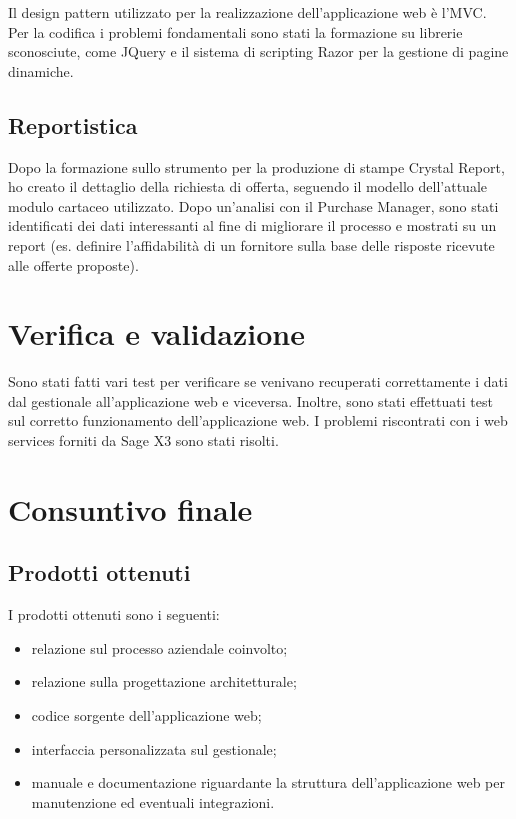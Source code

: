 Il design pattern utilizzato per la realizzazione dell’applicazione web è l’MVC.
Per la codifica i problemi fondamentali sono stati la formazione su librerie sconosciute, come JQuery e il sistema di scripting Razor per la gestione di pagine dinamiche. 



\subsection{Reportistica}

Dopo la formazione sullo strumento per la produzione di stampe Crystal Report, ho creato il dettaglio della richiesta di offerta, seguendo il modello dell’attuale modulo
cartaceo utilizzato.
Dopo un’analisi con il Purchase Manager, sono stati identificati dei dati interessanti al fine di migliorare il processo e mostrati su un report (es. definire l’affidabilità di un fornitore sulla base delle risposte ricevute alle offerte proposte).




\section{Verifica e validazione}

Sono stati fatti vari test per verificare se venivano recuperati correttamente i dati dal gestionale all’applicazione web e viceversa. Inoltre, sono stati effettuati test sul corretto funzionamento dell’applicazione web. I problemi riscontrati con i web services forniti da Sage X3 sono stati risolti.




\section{Consuntivo finale}

\subsection{Prodotti ottenuti}

I prodotti ottenuti sono i seguenti:

\begin{itemize}
	\item relazione sul processo aziendale coinvolto;
	\item relazione sulla progettazione architetturale;
	\item codice sorgente dell’applicazione web;
	\item interfaccia personalizzata sul gestionale;
	\item manuale e documentazione riguardante la struttura dell’applicazione web per
	manutenzione ed eventuali integrazioni.
\end{itemize}

